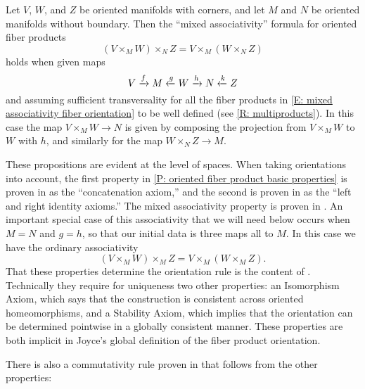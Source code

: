 \begin{proposition}\label{P: oriented fiber mixed associativity}
Let $V$, $W$, and $Z$ be oriented manifolds with corners, and let $M$ and $N$ be oriented manifolds without boundary. Then the ``mixed associativity'' formula for oriented fiber products
\begin{equation}\label{E: mixed associativity fiber orientation}
(V\times_MW)\times_N Z=V\times_M(W\times_N Z)
\end{equation}
holds when given maps
$$V\xrightarrow{f} M\xleftarrow{g} W\xrightarrow{h} N\xleftarrow{k} Z$$
and assuming sufficient transversality for all the fiber products in \eqref{E: mixed associativity fiber orientation} to be well defined (see \cref{R: multiproducts}).
 In this case the map $V\times_MW\to N$ is given by composing the projection from $V\times_MW$ to $W$ with $h$, and similarly for the map $W\times_N Z\to M$.
\end{proposition}

These propositions are evident at the level of spaces. When taking orientations into account, the first property in \cref{P: oriented fiber product basic properties} is proven in \cite[Sections 9.3.9]{RamBas09} as the ``concatenation axiom,'' and the second is  proven in \cite[Sections 9.3.5 and 9.3.6]{RamBas09} as the ``left and right identity axioms.''
The mixed associativity property is proven in \cite[Sections 9.3.7]{RamBas09}.
An important special case of this associativity that we will need below occurs when $M=N$ and $g=h$, so that our initial data is three maps all to $M$. In this case we have the ordinary associativity
\begin{equation}\label{E: oriented fiber associativity}
(V\times_MW)\times_M Z=V\times_M(W\times_M Z).
\end{equation}
That these properties determine the orientation rule is the content of \cite[Theorem 9-10]{RamBas09}. Technically they require for uniqueness two other properties: an Isomorphism Axiom, which says that the construction is consistent across oriented homeomorphisms, and a Stability Axiom, which implies that the orientation can be determined pointwise in a globally consistent manner. These properties are both implicit in Joyce's global definition of the fiber product orientation.

There is also a commutativity rule proven in \cite[Sections 9.3.8]{RamBas09} that follows from the other properties:

